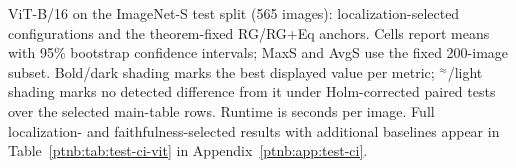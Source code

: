\begin{table}[tbp]
    \centering
    \caption[Selected ViT-B/16 attribution results]{ViT-B/16 on the ImageNet-S test split (565 images): localization-selected configurations and the theorem-fixed RG/RG+Eq anchors. Cells report means with 95\% bootstrap confidence intervals; MaxS and AvgS use the fixed 200-image subset. Bold/dark shading marks the best displayed value per metric; $^{\approx}$/light shading marks no detected difference from it under Holm-corrected paired tests over the selected main-table rows. Runtime is seconds per image. Full localization- and faithfulness-selected results with additional baselines appear in Table~\ref{ptnb:tab:test-ci-vit} in Appendix~\ref{ptnb:app:test-ci}.}
    \label{ptnb:tab:eval-vit}\label{tab:eval-vit}
\end{table}
